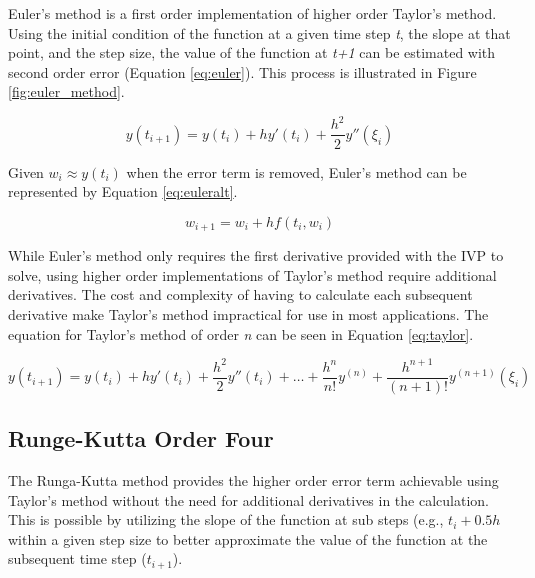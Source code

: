 \documentclass{article}
\begin{document}
Euler's method is a first order implementation of higher order Taylor's method. Using the initial condition of the function at a given time step \textit{t}, the slope at that point, and the step size, the value of the function at \textit{t+1} can be estimated with second order error (Equation \ref{eq:euler}). This process is illustrated in Figure \ref{fig:euler_method}.

\begin{center}
	\begin{equation}
	y(t_{i+1}) = y(t_i) + hy'(t_i)+\frac{h^2}{2}y''(\xi_i) 
	\label{eq:euler}
	\end{equation}
\end{center}

Given $w_i \approx y(t_i)$ when the error term is removed, Euler's method can be represented by Equation \ref{eq:euleralt}.

\begin{center}
	\begin{equation}
	w_{i+1} = w_i + hf(t_i, w_i)
	\label{eq:euleralt}
	\end{equation}
\end{center}

While Euler's method only requires the first derivative provided with the IVP to solve, using higher order implementations of Taylor's method require additional derivatives. The cost and complexity of having to calculate each subsequent derivative make Taylor's method impractical for use in most applications. The equation for Taylor's method of order \textit{n} can be seen in Equation \ref{eq:taylor}.

\begin{center}
	\begin{equation}
	y(t_{i+1}) = y(t_i) + hy'(t_i)+\frac{h^2}{2}y''(t_i) + \dots + \frac{h^n}{n!}y^{(n)} + \frac{h^{n+1}}{(n+1)!}y^{(n+1)}(\xi_i) 
	\label{eq:taylor}
	\end{equation}
\end{center}


\subsection{Runge-Kutta Order Four}
\label{method:rk}

The Runga-Kutta method provides the higher order error term achievable using Taylor's method without the need for additional derivatives in the calculation. This is possible by utilizing the slope of the function at sub steps (e.g., $t_i+0.5h$ within a given step size to better approximate the value of the function at the subsequent time step ($t_{i+1}$).
\end{document}

